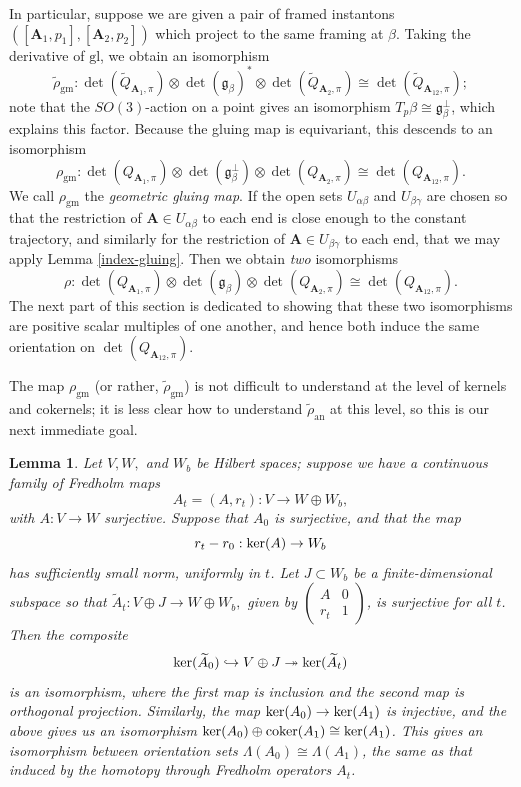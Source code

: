 \documentclass[10pt,a4paper]{amsart}
\newtheorem{lemma}[theorem]{Lemma}
\theoremstyle{definition}
\theoremstyle{remark}
\numberwithin{figure}{qchap}
\begin{document}
In particular, suppose we are given a pair of framed instantons $([\mathbf{A}_1,p_1], [\mathbf{A}_2,p_2])$ which project to the same framing at $\beta$. Taking the derivative of $\text{gl}$, we obtain an isomorphism $$\widetilde{\rho}_{\text{gm}}: \det\left(\widetilde{Q}_{\mathbf{A}_1, \pi}\right) \otimes \det(\mathfrak g_\beta)^* \otimes \det\left(\widetilde{Q}_{\mathbf{A}_2, \pi}\right) \cong \det\left(\widetilde{Q}_{\mathbf{A}_{12}, \pi}\right);$$ note that the $SO(3)$-action on a point gives an isomorphism $T_p \beta \cong \mathfrak g_\beta^\perp$, which explains this factor. Because the gluing map is equivariant, this descends to an isomorphism $$\rho_{\text{gm}}: \det\left({Q_{\mathbf{A}_1, \pi}}\right) \otimes \det(\mathfrak g^\perp_\beta) \otimes \det\left({Q_{\mathbf{A}_2, \pi}}\right) \cong \det\left({Q_{\mathbf{A}_{12}, \pi}}\right).$$
We call $\rho_{\text{gm}}$ the \emph{geometric gluing map}. If the open sets $U_{\alpha \beta}$ and $U_{\beta \gamma}$ are chosen so that the restriction of $\mathbf{A} \in U_{\alpha \beta}$ to each end is close enough to the constant trajectory, and similarly for the restriction of $\mathbf{A} \in U_{\beta \gamma}$ to each end, that we may apply Lemma \ref{index-gluing}. Then we obtain \emph{two} isomorphisms
$$\rho: \det\left({Q_{\mathbf{A}_1, \pi}}\right) \otimes \det(\mathfrak g_\beta) \otimes \det\left({Q_{\mathbf{A}_2, \pi}}\right) \cong \det\left({Q_{\mathbf{A}_{12}, \pi}}\right).$$ 
The next part of this section is dedicated to showing that these two isomorphisms are positive scalar multiples of one another, and hence both induce the same orientation on $\det\left({Q_{\mathbf{A}_{12}, \pi}}\right)$.

The map $\rho_{\text{gm}}$ (or rather, $\widetilde{\rho}_{\text{gm}}$) is not difficult to understand at the level of kernels and cokernels; it is less clear how to understand $\widetilde{\rho}_{\text{an}}$ at this level, so this is our next immediate goal. 

\begin{lemma}\label{ker-coker}Let $V, W, $ and $W_b$ be Hilbert spaces; suppose we have a continuous family of Fredholm maps $$A_t = (A, r_t): V \to W \oplus W_b,$$ with $A: V \to W$ surjective. Suppose that $A_0$ is surjective, and that the map $$r_t - r_0: \textup{ker}(A) \to W_b$$ has sufficiently small norm, uniformly in $t$. Let $J \subset W_b$ be a finite-dimensional subspace so that $\widetilde A_t: V \oplus J \to W \oplus W_b,$ given by $\begin{pmatrix}A & 0\\ r_t & 1\end{pmatrix}$, is surjective for all $t$. Then the composite $$\textup{ker}(\widetilde{A}_0) \hookrightarrow V \oplus J \twoheadrightarrow \textup{ker}(\widetilde A_t)$$ is an isomorphism, where the first map is inclusion and the second map is orthogonal projection. Similarly, the map $\textup{ker}(A_0) \to \textup{ker}(A_1)$ is injective, and the above gives us an isomorphism $\textup{ker}(A_0) \oplus \textup{coker}(A_1) \cong \textup{ker}(A_1)$. This gives an isomorphism between orientation sets $\Lambda(A_0) \cong \Lambda(A_1)$, the same as that induced by the homotopy through Fredholm operators $A_t$.
\end{lemma}
\end{document}
